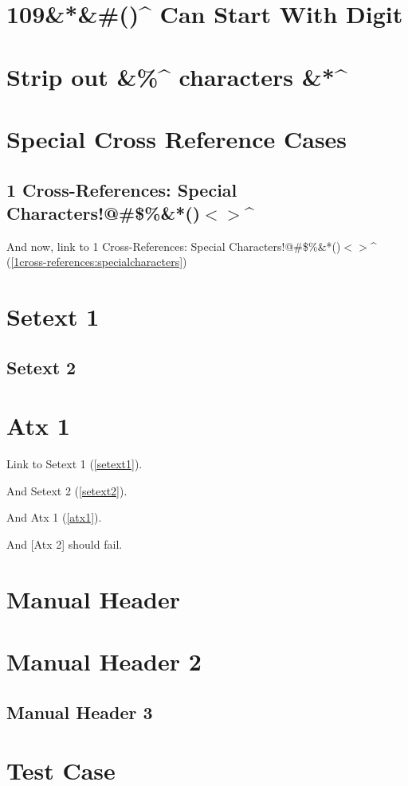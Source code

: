 
\def\mytitle{MultiMarkdown Autoreference Test}


\chapter{109\&*\&\#()\^{} Can Start With Digit}
\label{109canstartwithdigit}

\chapter{Strip out \&\%\^{} characters \&*\^{}}
\label{stripoutcharacters}

\chapter{Special Cross Reference Cases}
\label{specialcrossreferencecases}

\section{1 Cross-References: Special Characters!@\#\$\%\&*()$<$$>$\^{}}
\label{1cross-references:specialcharacters}

And now, link to 1 Cross-References: Special Characters!@\#\$\%\&*()$<$$>$\^{} (\autoref{1cross-references:specialcharacters})

\chapter{Setext 1}
\label{setext1}

\section{Setext 2}
\label{setext2}

\chapter{Atx 1}
\label{atx1}

Link to Setext 1 (\autoref{setext1}).

And Setext 2 (\autoref{setext2}).

And Atx 1 (\autoref{atx1}).

And [Atx 2] should fail.

\chapter{Manual Header}
\label{label}

\chapter{Manual Header 2}
\label{label2}

\section{Manual Header 3}
\label{label3}

\chapter{Test Case}
\label{test}




